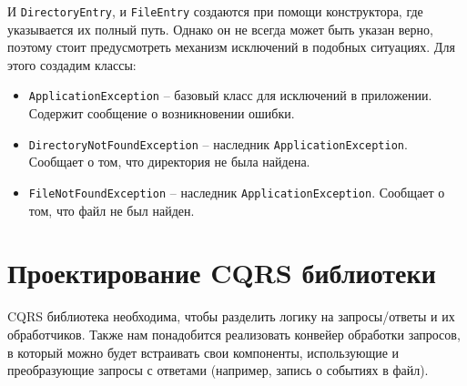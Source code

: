 И \verb|DirectoryEntry|, и \verb|FileEntry| создаются при помощи конструктора, где указывается их полный путь. Однако он не всегда может быть указан верно, поэтому стоит предусмотреть механизм исключений в подобных ситуациях. Для этого создадим классы:

\begin{itemize}
	\item \verb|ApplicationException| – базовый класс для исключений в приложении. Содержит сообщение о возникновении ошибки.
	\item \verb|DirectoryNotFoundException| – наследник \verb|ApplicationException|. Сообщает о том, что директория не была найдена.
	\item \verb|FileNotFoundException| – наследник \verb|ApplicationException|. Сообщает о том, что файл не был найден.
\end{itemize}

\section{Проектирование CQRS библиотеки} \label{ch1:conclusion3}

CQRS библиотека необходима, чтобы разделить логику на запросы/ответы и их обработчиков. Также нам понадобится реализовать конвейер обработки запросов, в который можно будет встраивать свои компоненты, использующие и преобразующие запросы с ответами (например, запись о событиях в файл).

